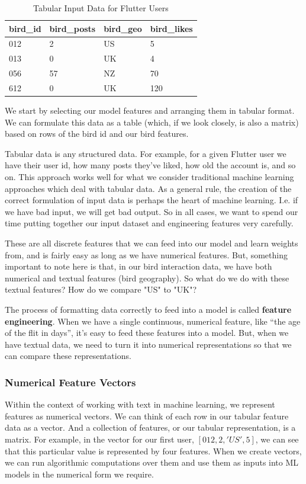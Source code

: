 \documentclass[11pt, table]{diazessay} %
\begin{document}
\begin{sloppypar}
\begin{table}[H]
  \centering
    \caption{Tabular Input Data for Flutter Users}
\begin{tabular}{|l|l|l|l|}
\hline
\rowcolor[HTML]{D5E7F7} 
bird\_id & bird\_posts & bird\_geo & bird\_likes \\ \hline
012      & 2           & US        & 5           \\ \hline
013      & 0           & UK        & 4           \\ \hline
056      & 57          & NZ        & 70          \\ \hline
612      & 0           & UK        & 120         \\ \hline
\end{tabular}
\end{table}

We start by selecting our model features and arranging them in tabular format.  We can formulate this data as a table (which, if we look closely, is also a matrix) based on rows of the bird id and our bird features.

Tabular data is any structured data. For example, for a given Flutter user we have their user id, how many posts they've liked, how old the account is, and so on. This approach works well for what we consider traditional machine learning approaches which deal with tabular data.  As a general rule, the creation of the correct formulation of input data is perhaps the heart of machine learning. I.e. if we have bad input, we will get bad output. So in all cases, we want to spend our time putting together our input dataset and engineering features very carefully. 

These are all discrete features that we can feed into our model and learn weights from, and is fairly easy as long as we have numerical features.  But, something important to note here is that, in our bird interaction data, we have both numerical and textual features (bird geography). So what do we do with these textual features? How do we compare "US" to "UK"? 

The process of formatting data correctly to feed into a model is called \textbf{feature engineering}. When we have a single continuous, numerical feature, like “the age of the flit in days”, it’s easy to feed these features into a model. But, when we have textual data, we need to turn it into numerical representations so that we can compare these representations.  

\subsubsection{Numerical Feature Vectors}
Within the context of working with text in machine learning, we represent features as numerical vectors. We can think of each row in our tabular feature data as a vector. And a collection of features, or our tabular representation, is a matrix. For example, in the vector for our first user, $[012, 2, 'US', 5]$, we can see that this particular value is represented by four features. When we create vectors, we can run algorithmic computations over them and use them as inputs into ML models in the numerical form we require. 


\end{sloppypar}
\end{document}
